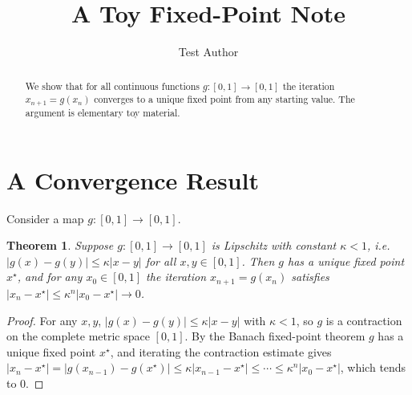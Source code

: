 \documentclass{article}
\newtheorem{theorem}{Theorem}
\begin{document}
\title{A Toy Fixed-Point Note}
\author{Test Author}
\maketitle

\begin{abstract}
We show that for all continuous functions $g : [0, 1] \to [0, 1]$ the iteration
$x_{n+1} = g(x_n)$ converges to a unique fixed point from any starting value.
The argument is elementary toy material.
\end{abstract}

\section{A Convergence Result}
Consider a map $g : [0, 1] \to [0, 1]$.

\begin{theorem}
\label{thm:contraction}
Suppose $g : [0, 1] \to [0, 1]$ is Lipschitz with constant $\kappa < 1$, i.e.
$|g(x) - g(y)| \le \kappa |x - y|$ for all $x, y \in [0, 1]$. Then $g$ has a
unique fixed point $x^\star$, and for any $x_0 \in [0, 1]$ the iteration
$x_{n+1} = g(x_n)$ satisfies $|x_n - x^\star| \le \kappa^n |x_0 - x^\star| \to 0$.
\end{theorem}

\begin{proof}
For any $x, y$, $|g(x) - g(y)| \le \kappa |x - y|$ with $\kappa < 1$, so $g$ is a
contraction on the complete metric space $[0, 1]$. By the Banach fixed-point
theorem $g$ has a unique fixed point $x^\star$, and iterating the contraction
estimate gives $|x_n - x^\star| = |g(x_{n-1}) - g(x^\star)| \le \kappa |x_{n-1} -
x^\star| \le \cdots \le \kappa^n |x_0 - x^\star|$, which tends to $0$.
\end{proof}
\end{document}
